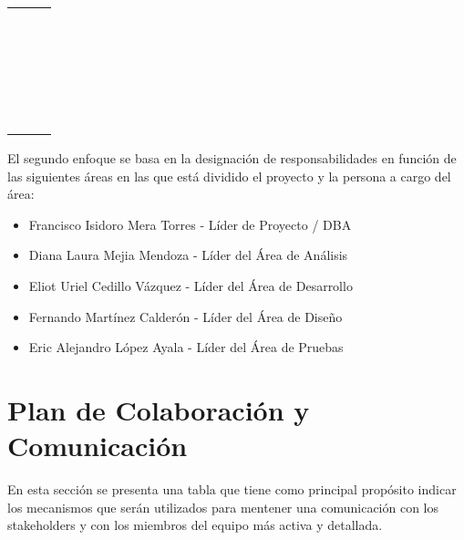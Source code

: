 \begin{center}
\begin{longtable}{|p{}|p{}|p{}|}
		 & & \\
		 & & \\ 
		 & & \\
		 & & \\ 
		 & & \\
		 & & \\ 
		 & & \\
		 & & \\ 
		 & & \\
		 & & \\ 
		 & & \\
		 & & \\ 
		 & & \\
		 & & \\ 
		 & & \\
		 & & \\ 
		 & & \\
		 & & \\ 
		 & & \\
		 & & \\ 
		 & & \\
		 & & \\ 
		 & & \\
		\hline
\end{longtable}
\end{center}


El segundo enfoque se basa en la designación de responsabilidades en función de las siguientes áreas en las que está dividido el proyecto y la persona a cargo del área:
	\begin{itemize}[label=\color{secundario}\Coffeecup]
		\item Francisco Isidoro Mera Torres - Líder de Proyecto / DBA
		\item Diana Laura Mejia Mendoza  - Líder del Área de Análisis
		\item Eliot Uriel Cedillo Vázquez - Líder del Área de Desarrollo
		\item Fernando Martínez Calderón - Líder del Área de Diseño
		\item Eric Alejandro López Ayala - Líder del Área de Pruebas
	\end{itemize}

\section{Plan de Colaboración y Comunicación}

En esta sección se presenta una tabla que tiene como principal propósito indicar los mecanismos que serán utilizados para mentener una comunicación con los stakeholders y con los miembros del equipo más activa y detallada.


